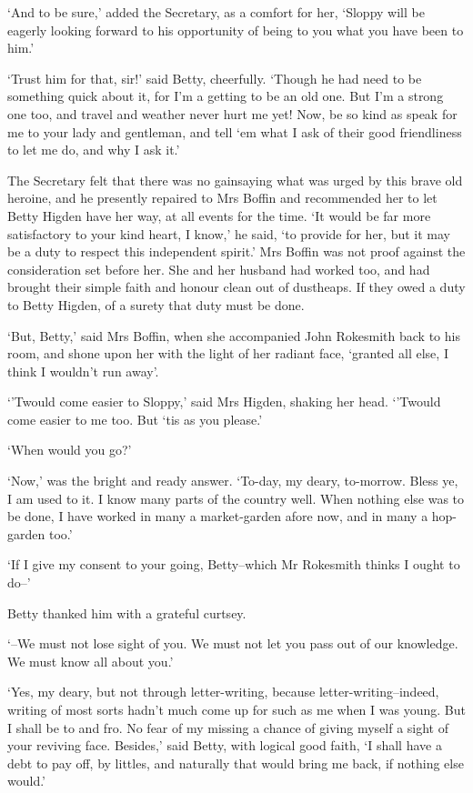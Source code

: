 ‘And to be sure,’ added the Secretary, as a comfort for her, ‘Sloppy
will be eagerly looking forward to his opportunity of being to you what
you have been to him.’

‘Trust him for that, sir!’ said Betty, cheerfully. ‘Though he had need
to be something quick about it, for I’m a getting to be an old one. But
I’m a strong one too, and travel and weather never hurt me yet! Now, be
so kind as speak for me to your lady and gentleman, and tell ‘em what I
ask of their good friendliness to let me do, and why I ask it.’

The Secretary felt that there was no gainsaying what was urged by
this brave old heroine, and he presently repaired to Mrs Boffin and
recommended her to let Betty Higden have her way, at all events for the
time. ‘It would be far more satisfactory to your kind heart, I know,’
he said, ‘to provide for her, but it may be a duty to respect this
independent spirit.’ Mrs Boffin was not proof against the consideration
set before her. She and her husband had worked too, and had brought
their simple faith and honour clean out of dustheaps. If they owed a
duty to Betty Higden, of a surety that duty must be done.

‘But, Betty,’ said Mrs Boffin, when she accompanied John Rokesmith back
to his room, and shone upon her with the light of her radiant face,
‘granted all else, I think I wouldn’t run away’.

‘’Twould come easier to Sloppy,’ said Mrs Higden, shaking her head.
‘’Twould come easier to me too. But ‘tis as you please.’

‘When would you go?’

‘Now,’ was the bright and ready answer. ‘To-day, my deary, to-morrow.
Bless ye, I am used to it. I know many parts of the country well. When
nothing else was to be done, I have worked in many a market-garden afore
now, and in many a hop-garden too.’

‘If I give my consent to your going, Betty--which Mr Rokesmith thinks I
ought to do--’

Betty thanked him with a grateful curtsey.

‘--We must not lose sight of you. We must not let you pass out of our
knowledge. We must know all about you.’

‘Yes, my deary, but not through letter-writing, because
letter-writing--indeed, writing of most sorts hadn’t much come up for
such as me when I was young. But I shall be to and fro. No fear of
my missing a chance of giving myself a sight of your reviving face.
Besides,’ said Betty, with logical good faith, ‘I shall have a debt to
pay off, by littles, and naturally that would bring me back, if nothing
else would.’

